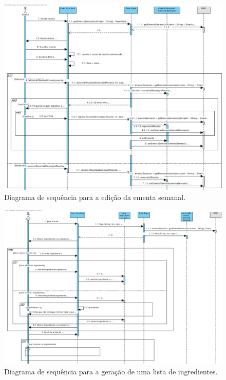  \begin{figure}[ht]
   \centering
   \includegraphics[width=\textwidth]{figures/10/Editar_ementa_semanal.pdf}
   \caption{Diagrama de sequência para a edição da ementa semanal.}
   \label{fig:negocio:DiagramaSequencia6}
 \end{figure}
 
 \begin{figure}[ht]
   \centering
   \includegraphics[width=\textwidth]{figures/10/Gerar_lista_de_ingredientes.pdf}
   \caption{Diagrama de sequência para a geração de uma lista de ingredientes.}
   \label{fig:negocio:DiagramaSequencia7}
 \end{figure}
 
